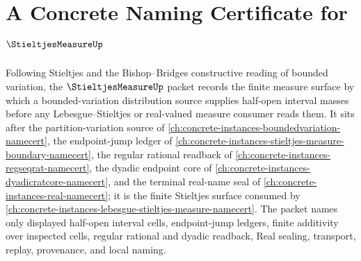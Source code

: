 \chapter{A Concrete Naming Certificate for $\StieltjesMeasureUp$}
\label{ch:concrete-instances-stieltjes-measure-namecert}

Following Stieltjes and the Bishop--Bridges constructive reading of bounded variation, the $\StieltjesMeasureUp$ packet records the finite measure surface by which a bounded-variation distribution source supplies half-open interval masses before any Lebesgue--Stieltjes or real-valued measure consumer reads them. It sits after the partition-variation source of \autoref{ch:concrete-instances-boundedvariation-namecert}, the endpoint-jump ledger of \autoref{ch:concrete-instances-stieltjes-measure-boundary-namecert}, the regular rational readback of \autoref{ch:concrete-instances-regseqrat-namecert}, the dyadic endpoint core of \autoref{ch:concrete-instances-dyadicratcore-namecert}, and the terminal real-name seal of \autoref{ch:concrete-instances-real-namecert}; it is the finite Stieltjes surface consumed by \autoref{ch:concrete-instances-lebesgue-stieltjes-measure-namecert}. The packet names only displayed half-open interval cells, endpoint-jump ledgers, finite additivity over inspected cells, regular rational and dyadic readback, Real sealing, transport, replay, provenance, and local naming.

